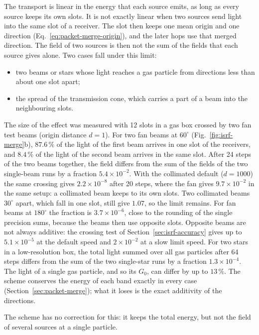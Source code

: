 The transport is linear in the energy that each source emits, as long as every
source keeps its own slots. It is not exactly linear when two sources send
light into the same slot of a receiver. The slot then keeps one mean origin and
one direction (Eq.~\eqref{eq:packet-merge-origin}), and the later hops use that
merged direction. The field of two sources is then not the sum of the fields
that each source gives alone. Two cases fall under this limit:
\begin{itemize}
  \item two beams or stars whose light reaches a gas particle from directions
    less than about one slot apart;
  \item the spread of the transmission cone, which carries a part of a beam
    into the neighbouring slots.
\end{itemize}
The size of the effect was measured with 12 slots in a gas box crossed by two
fan test beams (origin distance $d=1$). For two fan beams at $60^\circ$
(Fig.~\ref{fig:isrf-merge}b), $87.6\,\%$ of the light of the first beam
arrives in one slot of the receivers, and $8.4\,\%$ of the light of the second
beam arrives in the same slot. After 24 steps of the two beams together, the
field differs from the sum of the fields of the two single-beam runs by a
fraction $5.4\times10^{-2}$. With the collimated default ($d=1000$) the same
crossing gives $2.2\times10^{-8}$ after 20 steps, where the fan gives
$9.7\times10^{-2}$ in the same setup: a collimated beam keeps to its own slots.
Two collimated beams $30^\circ$ apart, which fall in one slot, still give
$1.07$, so the limit remains. For fan beams at $180^\circ$ the fraction is
$3.7\times10^{-6}$, close to the rounding of the single precision sums,
because the beams then use opposite slots. Opposite beams are not always
additive: the crossing test of Section~\ref{sec:isrf-accuracy} gives up to
$5.1\times10^{-5}$ at the default speed and $2\times10^{-2}$ at a slow limit
speed. For two stars in a
low-resolution box, the total light summed over all gas particles after 64
steps differs from the sum of the two single-star runs by a fraction
$1.3\times10^{-4}$. The light of a single gas particle, and so its $G_0$, can
differ by up to $13\,\%$. The scheme conserves the energy of each band exactly
in every case (Section~\ref{sec:packet-merge}); what it loses is the exact
additivity of the directions.

The scheme has no correction for this: it keeps the total energy, but not the
field of several sources at a single particle.

